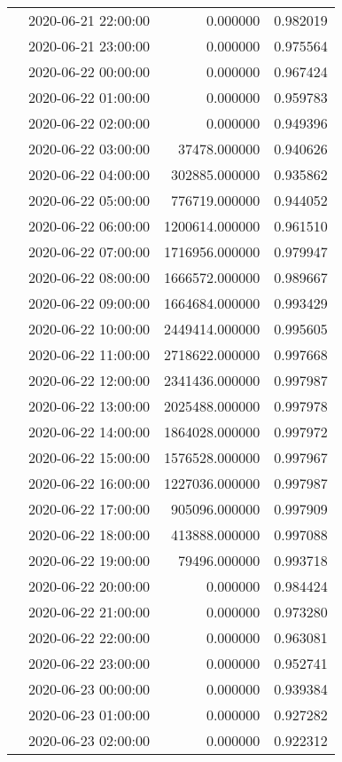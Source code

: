 \begin{tabular}{llrr}
 & 2020-06-21 22:00:00 & 0.000000 & 0.982019 \\
 & 2020-06-21 23:00:00 & 0.000000 & 0.975564 \\
 & 2020-06-22 00:00:00 & 0.000000 & 0.967424 \\
 & 2020-06-22 01:00:00 & 0.000000 & 0.959783 \\
 & 2020-06-22 02:00:00 & 0.000000 & 0.949396 \\
 & 2020-06-22 03:00:00 & 37478.000000 & 0.940626 \\
 & 2020-06-22 04:00:00 & 302885.000000 & 0.935862 \\
 & 2020-06-22 05:00:00 & 776719.000000 & 0.944052 \\
 & 2020-06-22 06:00:00 & 1200614.000000 & 0.961510 \\
 & 2020-06-22 07:00:00 & 1716956.000000 & 0.979947 \\
 & 2020-06-22 08:00:00 & 1666572.000000 & 0.989667 \\
 & 2020-06-22 09:00:00 & 1664684.000000 & 0.993429 \\
 & 2020-06-22 10:00:00 & 2449414.000000 & 0.995605 \\
 & 2020-06-22 11:00:00 & 2718622.000000 & 0.997668 \\
 & 2020-06-22 12:00:00 & 2341436.000000 & 0.997987 \\
 & 2020-06-22 13:00:00 & 2025488.000000 & 0.997978 \\
 & 2020-06-22 14:00:00 & 1864028.000000 & 0.997972 \\
 & 2020-06-22 15:00:00 & 1576528.000000 & 0.997967 \\
 & 2020-06-22 16:00:00 & 1227036.000000 & 0.997987 \\
 & 2020-06-22 17:00:00 & 905096.000000 & 0.997909 \\
 & 2020-06-22 18:00:00 & 413888.000000 & 0.997088 \\
 & 2020-06-22 19:00:00 & 79496.000000 & 0.993718 \\
 & 2020-06-22 20:00:00 & 0.000000 & 0.984424 \\
 & 2020-06-22 21:00:00 & 0.000000 & 0.973280 \\
 & 2020-06-22 22:00:00 & 0.000000 & 0.963081 \\
 & 2020-06-22 23:00:00 & 0.000000 & 0.952741 \\
 & 2020-06-23 00:00:00 & 0.000000 & 0.939384 \\
 & 2020-06-23 01:00:00 & 0.000000 & 0.927282 \\
 & 2020-06-23 02:00:00 & 0.000000 & 0.922312 \\

\end{tabular}
